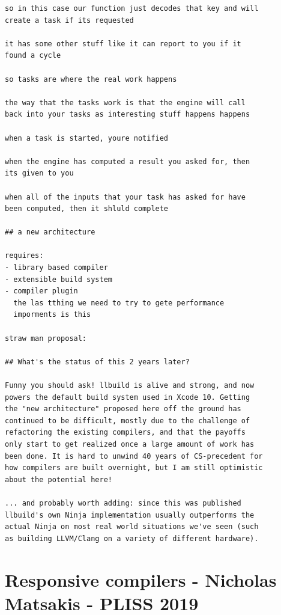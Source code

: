 \documentclass[12pt, a4paper]{report}
\begin{document}
\begin{Verbatim}[fontsize=\small]
so in this case our function just decodes that key and will
create a task if its requested

it has some other stuff like it can report to you if it
found a cycle

so tasks are where the real work happens

the way that the tasks work is that the engine will call
back into your tasks as interesting stuff happens happens

when a task is started, youre notified

when the engine has computed a result you asked for, then
its given to you

when all of the inputs that your task has asked for have
been computed, then it shluld complete

## a new architecture

requires:
- library based compiler
- extensible build system
- compiler plugin
  the las tthing we need to try to gete performance
  imporments is this

straw man proposal:

## What's the status of this 2 years later?

Funny you should ask! llbuild is alive and strong, and now
powers the default build system used in Xcode 10. Getting
the "new architecture" proposed here off the ground has
continued to be difficult, mostly due to the challenge of
refactoring the existing compilers, and that the payoffs
only start to get realized once a large amount of work has
been done. It is hard to unwind 40 years of CS-precedent for
how compilers are built overnight, but I am still optimistic
about the potential here!

... and probably worth adding: since this was published
llbuild's own Ninja implementation usually outperforms the
actual Ninja on most real world situations we've seen (such
as building LLVM/Clang on a variety of different hardware).

\end{Verbatim}

\section*{Responsive compilers - Nicholas Matsakis - PLISS 2019}
\cite{niko2019responsive}
\end{document}

